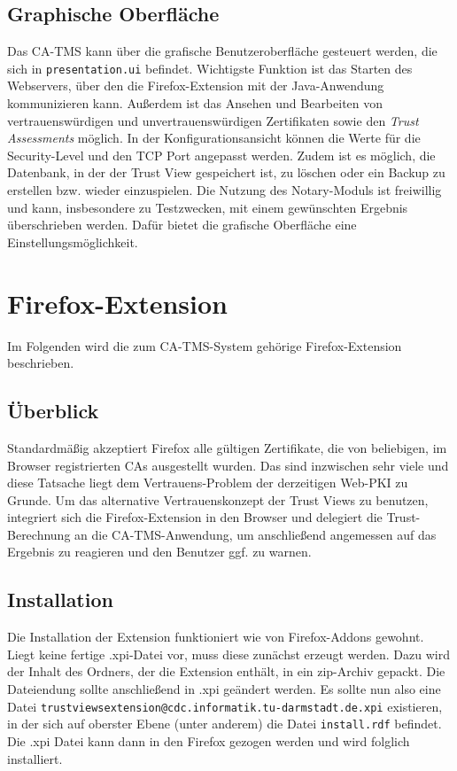 \documentclass[accentcolor=tud1c,article,colorback,11pt]{tudreport}
\begin{document}
\subsection{Graphische Oberfläche}
Das CA-TMS kann über die grafische Benutzeroberfläche gesteuert werden, die sich in \texttt{presentation.ui} befindet. Wichtigste Funktion ist das Starten des Webservers, über den die Firefox-Extension mit der Java-Anwendung kommunizieren kann. Außerdem ist das Ansehen und Bearbeiten von vertrauenswürdigen und unvertrauenswürdigen Zertifikaten sowie den \textit{Trust Assessments} möglich. In der Konfigurationsansicht können die Werte für die Security-Level und den TCP Port angepasst werden. Zudem ist es möglich, die Datenbank, in der der Trust View gespeichert ist, zu löschen oder ein Backup zu erstellen bzw. wieder einzuspielen. Die Nutzung des Notary-Moduls ist freiwillig und kann, insbesondere zu Testzwecken, mit einem gewünschten Ergebnis überschrieben werden. Dafür bietet die grafische Oberfläche eine Einstellungsmöglichkeit.

\section{Firefox-Extension}
Im Folgenden wird die zum CA-TMS-System gehörige Firefox-Extension beschrieben.

\subsection{Überblick}
Standardmäßig akzeptiert Firefox alle gültigen Zertifikate, die von beliebigen, im Browser registrierten CAs ausgestellt wurden. Das sind inzwischen sehr viele und diese Tatsache liegt dem Vertrauens-Problem der derzeitigen Web-PKI zu Grunde. Um das alternative Vertrauenskonzept der Trust Views zu benutzen, integriert sich die Firefox-Extension in den Browser und delegiert die Trust-Berechnung an die CA-TMS-Anwendung, um anschließend angemessen auf das Ergebnis zu reagieren und den Benutzer ggf. zu warnen.

\subsection{Installation}
Die Installation der Extension funktioniert wie von Firefox-Addons gewohnt. Liegt keine fertige .xpi-Datei vor, muss diese zunächst erzeugt werden. Dazu wird der Inhalt des Ordners, der die Extension enthält, in ein zip-Archiv gepackt. Die Dateiendung sollte anschließend in .xpi geändert werden. Es sollte nun also eine Datei \texttt{trustviewsextension@cdc.informatik.tu-darmstadt.de.xpi} existieren, in der sich auf oberster Ebene (unter anderem) die Datei \texttt{install.rdf} befindet. Die .xpi Datei kann dann in den Firefox gezogen werden und wird folglich installiert.
\end{document}
